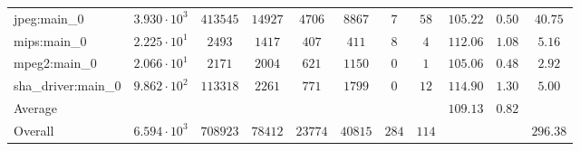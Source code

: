 \begin{tabular}{|l|c|c|c|c|c|c|c|c|c|c|}
jpeg:main\_0            & $ 3.930 \cdot 10^{3}  $ & $ 413545 $ & $ 14927 $ & $ 4706  $ & $ 8867  $ & $ 7   $ & $ 58  $ & $ 105.22      $ & $ 0.50    $ & $ 40.75   $ \\
mips:main\_0            & $ 2.225 \cdot 10^{1}  $ & $ 2493   $ & $ 1417  $ & $ 407   $ & $ 411   $ & $ 8   $ & $ 4   $ & $ 112.06      $ & $ 1.08    $ & $ 5.16    $ \\
mpeg2:main\_0           & $ 2.066 \cdot 10^{1}  $ & $ 2171   $ & $ 2004  $ & $ 621   $ & $ 1150  $ & $ 0   $ & $ 1   $ & $ 105.06      $ & $ 0.48    $ & $ 2.92    $ \\
sha\_driver:main\_0     & $ 9.862 \cdot 10^{2}  $ & $ 113318 $ & $ 2261  $ & $ 771   $ & $ 1799  $ & $ 0   $ & $ 12  $ & $ 114.90      $ & $ 1.30    $ & $ 5.00    $ \\
\hline
Average                 & $                     $ & $        $ & $       $ & $       $ & $       $ & $     $ & $     $ & $ 109.13      $ & $ 0.82    $ & $         $ \\
\hline
Overall                 & $ 6.594 \cdot 10^{3}  $ & $ 708923 $ & $ 78412 $ & $ 23774 $ & $ 40815 $ & $ 284 $ & $ 114 $ & $             $ & $         $ & $ 296.38  $ \\
\hline
\end{tabular}
